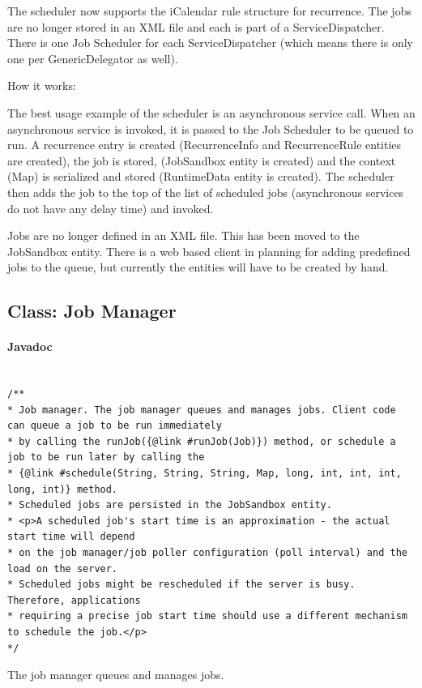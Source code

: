 \documentclass[english]{article}
\begin{document}
The scheduler now supports the iCalendar rule structure for recurrence. The jobs are no longer stored in an XML file and each is part of a ServiceDispatcher. There is one Job Scheduler for each ServiceDispatcher (which means there is only one per GenericDelegator as well).

How it works:

The best usage example of the scheduler is an asynchronous service call. When an asynchronous service is invoked, it is passed to the Job Scheduler to be queued to run. A recurrence entry is created (RecurrenceInfo and RecurrenceRule entities are created), the job is stored, (JobSandbox entity is created) and the context (Map) is serialized and stored (RuntimeData entity is created). The scheduler then adds the job to the top of the list of scheduled jobs (asynchronous services do not have any delay time) and invoked.

Jobs are no longer defined in an XML file. This has been moved to the JobSandbox entity. There is a web based client in planning for adding predefined jobs to the queue, but currently the entities will have to be created by hand.

\subsection{Class: Job Manager}
\paragraph{Javadoc}

\begin{lstlisting}

/**
* Job manager. The job manager queues and manages jobs. Client code can queue a job to be run immediately
* by calling the runJob({@link #runJob(Job)}) method, or schedule a job to be run later by calling the
* {@link #schedule(String, String, String, Map, long, int, int, int, long, int)} method.
* Scheduled jobs are persisted in the JobSandbox entity.
* <p>A scheduled job's start time is an approximation - the actual start time will depend
* on the job manager/job poller configuration (poll interval) and the load on the server.
* Scheduled jobs might be rescheduled if the server is busy. Therefore, applications
* requiring a precise job start time should use a different mechanism to schedule the job.</p>
*/

\end{lstlisting}

The job manager queues and manages jobs. 
\end{document}
